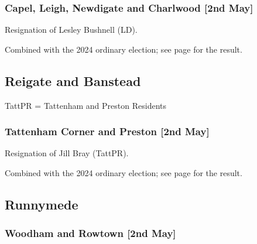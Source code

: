 \documentclass[a4paper,openany]{book}
\begin{document}
\begin{resultsiii}
\subsubsection*{Capel, Leigh, Newdigate and Charlwood \hspace*{\fill}\nolinebreak[1]%
	\enspace\hspace*{\fill}
	[2nd May]}


Resignation of Lesley Bushnell (LD).

Combined with the 2024 ordinary election; see page \pageref{MoleValleyCapelLeighNewdigateCharlwood} for the result.

\subsection*{Reigate and Banstead}

TattPR = Tattenham and Preston Residents

\subsubsection*{Tattenham Corner and Preston \hspace*{\fill}\nolinebreak[1]%
	\enspace\hspace*{\fill}
	[2nd May]}


Resignation of Jill Bray (TattPR).

Combined with the 2024 ordinary election; see page \pageref{ReigateBansteadTattenhamCornerPreston} for the result.

\subsection*{Runnymede}

\subsubsection*{Woodham and Rowtown \hspace*{\fill}\nolinebreak[1]%
	\enspace\hspace*{\fill}
	[2nd May]}



\end{resultsiii}
\end{document}
